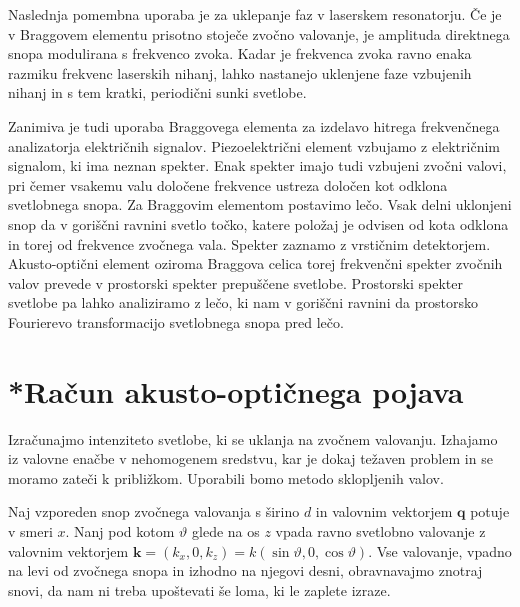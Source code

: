 Naslednja pomembna uporaba je za uklepanje faz
v laserskem resonatorju. Če je v Braggovem elementu prisotno stoječe zvočno
valovanje, je amplituda direktnega snopa modulirana s frekvenco zvoka.
Kadar je frekvenca zvoka ravno enaka razmiku frekvenc laserskih nihanj,
lahko nastanejo uklenjene faze vzbujenih nihanj in s tem kratki, periodični
sunki svetlobe.

Zanimiva je tudi uporaba Braggovega elementa za izdelavo
hitrega frekvenčnega analizatorja električnih signalov.  
Piezoelektrični element vzbujamo z električnim signalom,
ki ima neznan spekter. Enak spekter imajo tudi vzbujeni zvočni valovi, 
pri čemer vsakemu valu določene frekvence ustreza določen kot odklona svetlobnega
snopa. Za Braggovim elementom postavimo lečo. Vsak delni uklonjeni
snop da v goriščni ravnini svetlo točko, katere položaj je odvisen
od kota odklona in torej od frekvence zvočnega vala. Spekter zaznamo
z vrstičnim detektorjem. Akusto-optični element oziroma Braggova celica 
torej frekvenčni spekter zvočnih valov prevede v prostorski
spekter prepuščene svetlobe. Prostorski spekter svetlobe pa lahko
analiziramo z lečo, ki nam v goriščni ravnini da prostorsko
Fourierevo transformacijo svetlobnega snopa pred lečo.

\section{*Račun akusto-optičnega pojava}
Izračunajmo intenziteto svetlobe, ki se uklanja na zvočnem valovanju. Izhajamo 
iz valovne enačbe v nehomogenem sredstvu, kar je dokaj težaven problem
in se moramo zateči k približkom. Uporabili bomo metodo sklopljenih valov. 

Naj vzporeden snop zvočnega valovanja s širino $d$ in valovnim vektorjem $\mathbf{q}$ 
potuje v smeri $x$.
Nanj pod kotom $\vartheta$ glede na os $z$ vpada ravno svetlobno valovanje z valovnim vektorjem 
$\mathbf{k}=(k_{x},0,k_{z})= k(\sin\vartheta,0,\cos\vartheta)$.
Vse valovanje, vpadno na levi od zvočnega snopa in izhodno na njegovi desni,
obravnavajmo znotraj snovi, da nam ni treba upoštevati še loma, ki
le zaplete izraze. 

